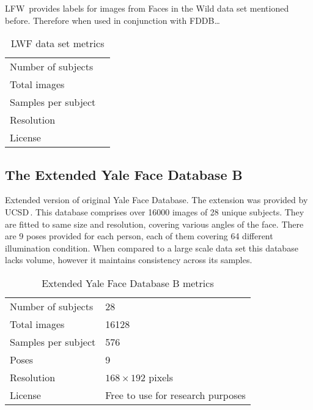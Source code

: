 LFW\,\cite{lfw} provides labels for images from Faces in the Wild data set mentioned before. Therefore when used in conjunction with FDDB\dots{}

\begin{table}[ht]
    \centering
    \caption{LWF data set metrics}

    \begin{tabularx}{0.75\textwidth}{l|l}
        \toprule
        Number of subjects &  \\
        Total images &  \\
        Samples per subject &  \\
        Resolution &  \\
        License &  \\
        \bottomrule
    \end{tabularx}
\end{table}

\subsection{The Extended Yale Face Database B}

Extended version of original Yale Face Database. The extension was provided by UCSD\,\cite{ext_yale_paper}. This database comprises over \num{16000} images of 28 unique subjects. They are fitted to same size and resolution, covering various angles of the face. There are 9 poses provided for each person, each of them covering 64 different illumination condition.  When compared to a large scale data set this database lacks volume, however it maintains consistency across its samples.

\begin{table}[ht]
    \centering
    \caption{Extended Yale Face Database B metrics}

    \begin{tabularx}{0.75\textwidth}{l|l}
        \toprule
        Number of subjects & 28 \\
        Total images & \num{16128} \\
        Samples per subject & 576 \\
        Poses & 9 \\
        Resolution & $168 \times 192$ pixels \\
        License & Free to use for research purposes\\
        \bottomrule
    \end{tabularx}
\end{table}

